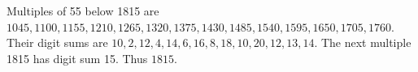 Multiples of 55 below 1815 are $1045,1100,1155,1210,1265,1320,1375,1430,1485,1540,1595,1650,1705,1760$. Their digit sums are $10,2,12,4,14,6,16,8,18,10,20,12,13,14$. The next multiple 1815 has digit sum 15. Thus $\boxed{1815}$.
